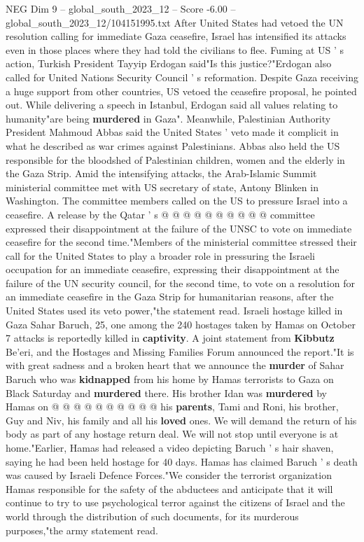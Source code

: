 \begin{textsample}{NEG Dim 9 – global\_south\_2023\_12 – Score -6.00 – global\_south\_2023\_12/104151995.txt}  \label{ex:f9_neg_305}
After United States had vetoed the UN resolution calling for immediate Gaza ceasefire, Israel has intensified its attacks even in those places where they had told the civilians to flee.
Fuming at US ' s action, Turkish President Tayyip Erdogan said"Is this justice?"Erdogan also called for United Nations Security Council ' s reformation.
Despite Gaza receiving a huge support from other countries, US vetoed the ceasefire proposal, he pointed out.
While delivering a speech in Istanbul, Erdogan said all values relating to humanity"are being \textbf{murdered} in Gaza".
Meanwhile, Palestinian Authority President Mahmoud Abbas said the United States ' veto made it complicit in what he described as war crimes against Palestinians.
Abbas also held the US responsible for the bloodshed of Palestinian children, women and the elderly in the Gaza Strip.
Amid the intensifying attacks, the Arab-Islamic Summit ministerial committee met with US secretary of state, Antony Blinken in Washington.
The committee members called on the US to pressure Israel into a ceasefire.
A release by the Qatar ' s @ @ @ @ @ @ @ @ @ @ committee expressed their disappointment at the failure of the UNSC to vote on immediate ceasefire for the second time."Members of the ministerial committee stressed their call for the United States to play a broader role in pressuring the Israeli occupation for an immediate ceasefire, expressing their disappointment at the failure of the UN security council, for the second time, to vote on a resolution for an immediate ceasefire in the Gaza Strip for humanitarian reasons, after the United States used its veto power,"the statement read.
Israeli hostage killed in Gaza Sahar Baruch, 25, one among the 240 hostages taken by Hamas on October 7 attacks is reportedly killed in \textbf{captivity}.
A joint statement from \textbf{Kibbutz} Be'eri, and the Hostages and Missing Families Forum announced the report."It is with great sadness and a broken heart that we announce the \textbf{murder} of Sahar Baruch who was \textbf{kidnapped} from his home by Hamas terrorists to Gaza on Black Saturday and \textbf{murdered} there.
His brother Idan was \textbf{murdered} by Hamas on @ @ @ @ @ @ @ @ @ @ his \textbf{parents}, Tami and Roni, his brother, Guy and Niv, his family and all his \textbf{loved} ones.
We will demand the return of his body as part of any hostage return deal.
We will not stop until everyone is at home."Earlier, Hamas had released a video depicting Baruch ' s hair shaven, saying he had been held hostage for 40 days.
Hamas has claimed Baruch ' s death was caused by Israeli Defence Forces."We consider the terrorist organization Hamas responsible for the safety of the abductees and anticipate that it will continue to try to use psychological terror against the citizens of Israel and the world through the distribution of such documents, for its murderous purposes,"the army statement read.

\end{textsample}
